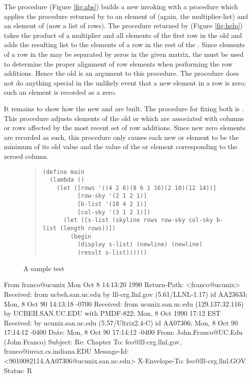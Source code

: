 The procedure  (Figure \ref{fig:abs}) builds a new 
invoking  with  a procedure which applies the
procedure returned by  to an element of  (again, the
multiplier-list) and an element of  (now a list of rows).
The procedure returned by  (Figure \ref{fig:help}) takes the
product of a multiplier
and all elements of the first row in the old  and adds the
resulting list to the elements of a row in the rest of the .
Since elements of a row in the  may be separated by zeros in the
given matrix, the  must be used to determine the proper
alignment of row elements when performing the row additions.  Hence the old
 is an argument to this procedure.  The procedure does not
do anything special in the unlikely event that a new element in a row is zero;
such an element is recorded as a zero.

It remains to show how the new  and
 are built.  The procedure for fixing both is
.  This procedure adjusts elements of the old
 or  which are associated with columns
or rows affected by the most recent set of row additions.  Since new zero
elements are recorded as such, this procedure only causes each new
 or  element to be the minimum
of its old value and the value of the  or
 element corresponding to the zeroed column.

\begin{figure}
\begin{frameit}
\begin{quote}
\begin{verbatim}
(define main
  (lambda ()
    (let ([rows '((4 2 6)(8 6 1 16)(2 10)(12 14))]
          [row-sky '(2 1 2 1)]
          [b-list '(10 4 2 1)]
          [col-sky '(3 1 2 1)])
      (let ([s-list (skyline rows row-sky col-sky b-list (length rows))])
        (begin
          (display s-list) (newline) (newline)
          (result s-list))))))
\end{verbatim}
\end{quote}
\caption{A sample test}
\end{frameit}
\end{figure}


From franco@ucunix Mon Oct  8 14:13:20 1990
Return-Path: <franco@ucunix>
Received: from ucbeh.san.uc.edu by lll-crg.llnl.gov (5.61/LLNL-1.17)
	id AA23633; Mon, 8 Oct 90 14:13:18 -0700
Received: from ucunix.san.uc.edu (129.137.32.116) by UCBEH.SAN.UC.EDU with
 PMDF-822; Mon, 8 Oct 1990 17:12 EST
Received: by ucunix.san.uc.edu (5.57/Ultrix2.4-C) id AA07306; Mon, 8 Oct 90
 17:14:12 -0400
Date: Mon, 8 Oct 90 17:14:12 -0400
From: John.Franco@UC.Edu (John Franco)
Subject: Re:  Chapter
To: feo@lll-crg.llnl.gov, franco@iuvax.cs.indiana.EDU
Message-Id: <9010082114.AA07306@ucunix.san.uc.edu>
X-Envelope-To: feo@lll-crg.llnl.GOV
Status: R

